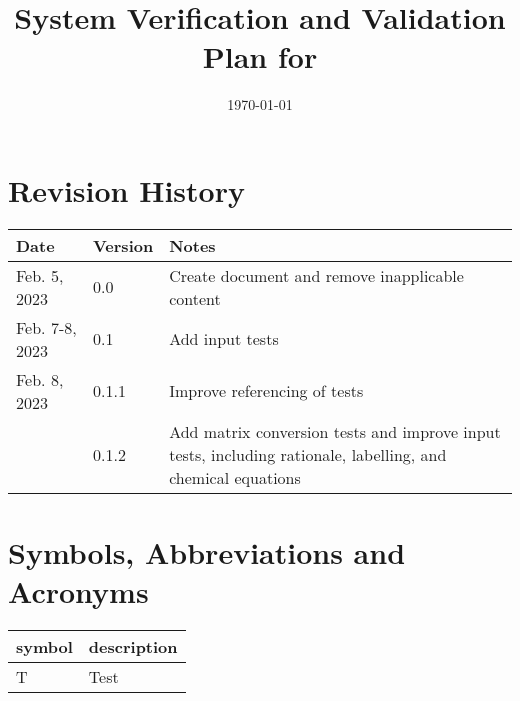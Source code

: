 \documentclass[12pt, titlepage]{article}
\begin{document}
\title{%
  System Verification and Validation Plan for \progname{}}
\author{\authname}
\date{\today}

\maketitle


\section{Revision History}

\begin{tabularx}{\textwidth}{llX}
  \toprule {\bf Date} & {\bf Version} & {\bf Notes}                     \\
  \midrule
  Feb. 5, 2023        & 0.0           & Create document and remove
  inapplicable content                                                  \\
  Feb. 7-8, 2023      & 0.1           & Add input tests                 \\
  Feb. 8, 2023        & 0.1.1         & Improve referencing of tests    \\
                      & 0.1.2         & Add matrix conversion tests and
  improve input tests, including rationale, labelling, and chemical
  equations                                                             \\
  \bottomrule
\end{tabularx}

\newpage

\tableofcontents

\listoftables
{}

\listoffigures
{}

\newpage

\section{Symbols, Abbreviations and Acronyms}

\renewcommand{\arraystretch}{1.2}
\begin{tabular}{l l}
  \toprule
  \textbf{symbol} & \textbf{description} \\
  \midrule
  T               & Test                 \\
  \bottomrule
\end{tabular}\\
\end{document}
